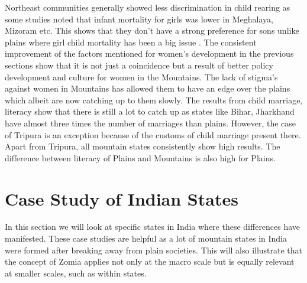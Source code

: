 Northeast communities generally showed less discrimination in child rearing as some studies noted that infant mortality for girls was lower in Meghalaya, Mizoram etc. This shows that they don't have a strong preference for sons unlike plains where girl child mortality has been a big issue \citep{mahanta2013gender}. The  consistent improvement of the factors mentioned for women's development in the previous sections show that it is not just a coincidence but a result of better policy development and culture for women in the Mountains. The lack of stigma's against women in Mountains has allowed them to have an edge over the plains which albeit are now catching up to them slowly. The results from child marriage, literacy show that there is still a lot to catch up as states like Bihar, Jharkhand have almost three times the number of marriages than plains. However, the case of Tripura is an exception because of the customs of child marriage present there. Apart from Tripura, all mountain states consistently show high results. The difference between literacy of Plains and Mountains is also high for Plains.

\section{Case Study of Indian States}
In this section we will look at specific states in India where these differences have manifested. These case studies are helpful as a lot of mountain states in India were formed after breaking away from plain societies. This will also illustrate that the concept of Zomia applies not only at the macro scale but is equally relevant at smaller scales, such as within states.

